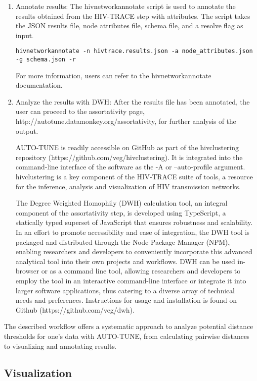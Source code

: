 \documentclass[utf8]{FrontiersinHarvard} %
\begin{document}
\begin{enumerate}
\item{ Annotate results: The hivnetworkannotate script is used to annotate the results obtained from the HIV-TRACE step with attributes. The script takes the JSON results file, node attributes file, schema file, and a resolve flag as input.
	\begin{lstlisting}[style=BashInputStyle]
hivnetworkannotate -n hivtrace.results.json -a node_attributes.json -g schema.json -r
	\end{lstlisting}
 For more information, users can refer to the hivnetworkannotate documentation.
}

\item{ Analyze the results with DWH: After the results file has been annotated, the user can proceed to the assortativity page, http://autotune.datamonkey.org/assortativity, for further analysis of the output. }

AUTO-TUNE is readily accessible on GitHub as part of the hivclustering repository (https://github.com/veg/hivclustering). It is integrated into the command-line interface of the software as the -A or --auto-profile argument. hivclustering is a key component of the HIV-TRACE suite of tools, a resource for the inference, analysis and visualization of HIV transmission networks. 

The Degree Weighted Homophily (DWH) calculation tool, an integral component of the assortativity step, is developed using TypeScript, a statically typed superset of JavaScript that ensures robustness and scalability. In an effort to promote accessibility and ease of integration, the DWH tool is packaged and distributed through the Node Package Manager (NPM), enabling researchers and developers to conveniently incorporate this advanced analytical tool into their own projects and workflows. DWH can be used in-browser or as a command line tool, allowing researchers and developers to employ the tool in an interactive command-line interface or integrate it into larger software applications, thus catering to a diverse array of technical needs and preferences. Instructions for usage and installation is found on Github (https://github.com/veg/dwh).

\end{enumerate}

The described workflow offers a systematic approach to analyze potential distance thresholds for one's data with AUTO-TUNE, from calculating pairwise distances to visualizing and annotating results.

\subsection{Visualization}
\end{document}

